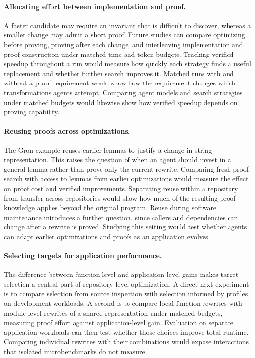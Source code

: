\documentclass{article}
\begin{document}
\paragraph{Allocating effort between implementation and proof.}
A faster candidate may require an invariant that is difficult to discover, whereas a smaller change may admit a short proof.
Future studies can compare optimizing before proving, proving after each change, and interleaving implementation and proof construction under matched time and token budgets.
Tracking verified speedup throughout a run would measure how quickly each strategy finds a useful replacement and whether further search improves it.
Matched runs with and without a proof requirement would show how the requirement changes which transformations agents attempt.
Comparing agent models and search strategies under matched budgets would likewise show how verified speedup depends on proving capability.

\paragraph{Reusing proofs across optimizations.}
The Gron example reuses earlier lemmas to justify a change in string representation.
This raises the question of when an agent should invest in a general lemma rather than prove only the current rewrite.
Comparing fresh proof search with access to lemmas from earlier optimizations would measure the effect on proof cost and verified improvements.
Separating reuse within a repository from transfer across repositories would show how much of the resulting proof knowledge applies beyond the original program.
Reuse during software maintenance introduces a further question, since callers and dependencies can change after a rewrite is proved.
Studying this setting would test whether agents can adapt earlier optimizations and proofs as an application evolves.

\paragraph{Selecting targets for application performance.}
The difference between function-level and application-level gains makes target selection a central part of repository-level optimization.
A direct next experiment is to compare selection from source inspection with selection informed by profiles on development workloads.
A second is to compare local function rewrites with module-level rewrites of a shared representation under matched budgets, measuring proof effort against application-level gain.
Evaluation on separate application workloads can then test whether those choices improve total runtime.
Comparing individual rewrites with their combinations would expose interactions that isolated microbenchmarks do not measure.
\end{document}
